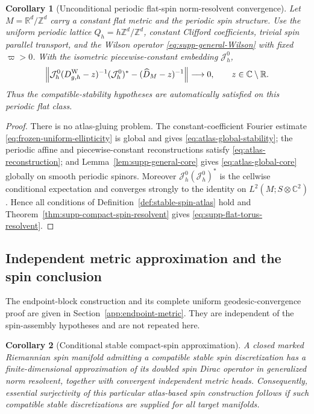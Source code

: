 \documentclass[11pt]{article}
\newtheorem{corollary}[corollary]{Corollary}
\theoremstyle{definition}
\theoremstyle{remark}
\theoremstyle{definition}
\theoremstyle{remark}
\newcommand{\Z}{\mathbb Z}
\newcommand{\R}{\mathbb R}
\newcommand{\C}{\mathbb C}
\begin{document}
\begin{corollary}[Unconditional periodic flat-spin norm-resolvent convergence]
\label{cor:supp-flat-torus-spin}
Let $M=\R^d/\Z^d$ carry a constant flat metric and the periodic spin structure.
Use the uniform periodic lattice $Q_h=h\Z^d/\Z^d$, constant Clifford
coefficients, trivial spin parallel transport, and the Wilson operator
\eqref{eq:supp-general-Wilson} with fixed $\varpi>0$.  With the isometric
piecewise-constant embedding $\mathcal J_h^0$,
\begin{equation}
 \left\|\mathcal J_h^0(D_{g,h}^{\rm W}-z)^{-1}(\mathcal J_h^0)^*
 -(\widehat D_M-z)^{-1}\right\|\longrightarrow0,
 \qquad z\in\C\setminus\R.
 \label{eq:supp-flat-torus-resolvent}
\end{equation}
Thus the compatible-stability hypotheses are automatically satisfied on this
periodic flat class.
\end{corollary}

\begin{proof}
There is no atlas-gluing problem.  The constant-coefficient Fourier estimate
\eqref{eq:frozen-uniform-ellipticity} is global and gives
\eqref{eq:atlas-global-stability}; the periodic affine and piecewise-constant
reconstructions satisfy \eqref{eq:atlas-reconstruction}; and
Lemma~\ref{lem:supp-general-core} gives \eqref{eq:atlas-global-core} globally on
smooth periodic spinors.  Moreover $\mathcal J_h^0(\mathcal J_h^0)^*$ is the
cellwise conditional expectation and converges strongly to the identity on
$L^2(M;S\otimes\C^2)$.  Hence all conditions of
Definition~\ref{def:stable-spin-atlas} hold and
Theorem~\ref{thm:supp-compact-spin-resolvent} gives
\eqref{eq:supp-flat-torus-resolvent}.
\end{proof}

\subsection{Independent metric approximation and the spin conclusion}

The endpoint-block construction and its complete uniform geodesic-convergence
proof are given in Section~\ref{app:endpoint-metric}.  They are independent of
the spin-assembly hypotheses and are not repeated here.

\begin{corollary}[Conditional stable compact-spin approximation]
\label{cor:supp-compact-spin-image}
A closed marked Riemannian spin manifold admitting a compatible stable spin
discretization has a finite-dimensional approximation of its doubled spin
Dirac operator in generalized norm resolvent, together with convergent
independent metric heads.  Consequently, essential surjectivity of this
particular atlas-based spin construction follows if such compatible stable
discretizations are supplied for all target manifolds.
\end{corollary}
\end{document}
